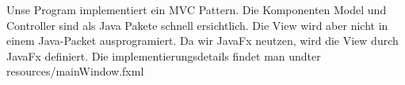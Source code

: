 
Unse Program implementiert ein MVC Pattern. Die Komponenten Model und Controller sind als Java Pakete schnell ersichtlich. Die View wird aber nicht in einem Java-Packet  ausprogramiert. Da wir JavaFx neutzen, wird die View durch JavaFx definiert. Die implementierungsdetails findet man undter resources/mainWindow.fxml 